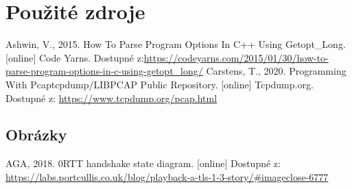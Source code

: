 \documentclass[a4paper, 12pt, titlepage]{article}
\begin{document}
\newpage
\section{Použité zdroje}
\begin{thebibliography}{99}
 Ashwin, V., 2015. How To Parse Program Options In C++ Using Getopt\_Long. [online] Code Yarns. Dostupné z:\url{https://codeyarns.com/2015/01/30/how-to-parse-program-options-in-c-using-getopt\_long/}
 Carstens, T., 2020. Programming With Pcaptcpdump/LIBPCAP Public Repository. [online] Tcpdump.org. Dostupné z: \url{https://www.tcpdump.org/pcap.html}

\end{thebibliography}

\subsection{Obrázky}
\begin{thebibliography}{99}
 AGA, 2018. 0RTT handshake state diagram. [online] Dostupné z: \url{https://labs.portcullis.co.uk/blog/playback-a-tls-1-3-story/#imageclose-6777}
\end{thebibliography}
\end{document}
